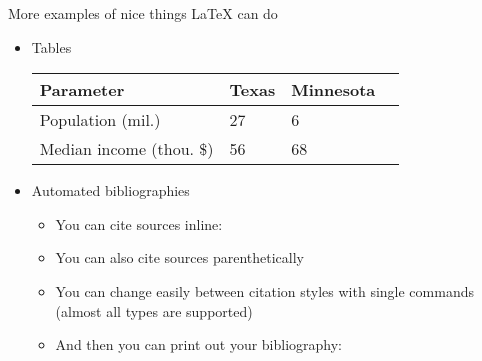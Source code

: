 \documentclass[capfont, final]{beamer}\usepackage[]{graphicx}\usepackage[]{color}
\newlength{\sepwid}
\newlength{\onecolwid}
\begin{document}
\begin{frame}[t, fragile]
\begin{columns}[T]
\begin{column}{\onecolwid}
\begin{block}{More examples of nice things \LaTeX{} can do}
\begin{itemize}
									\begin{equation}
											f(\zeta) = \int_{-\infty}^{\infty}f(x)e^{-2\pi i x \zeta} dx
									\end{equation}
							\item Tables
									\vspace{0.25em}	
									\begin{table}
									\small
									\centering
									\begin{tabular}{llll}
									\toprule
									\textbf{Parameter} & \textbf{Texas} & \textbf{Minnesota} \\
									\midrule
									Population (mil.) & 27 & 6 \\
									Median income (thou. \$) & 56 & 68\\
									\bottomrule
									\end{tabular}
									\end{table}
									\vspace{0.25em}
							\item Automated bibliographies
									\begin{itemize}
										\item You can cite sources inline: \textcite{Ashmore1991} 
										\item You can also cite sources parenthetically \autocite{Shamma2000}
										\item You can change easily between citation styles with single commands (almost all types are supported)
										\item And then you can print out your bibliography: 
									\end{itemize}
							\renewcommand*{\bibfont}{\footnotesize}
							\nocite{*}	
							\printbibliography
					\end{itemize}
				\end{block}
		\end{column} %
		\begin{column}{\sepwid}\end{column} %
	\end{columns} %
\end{frame}
\end{document}
